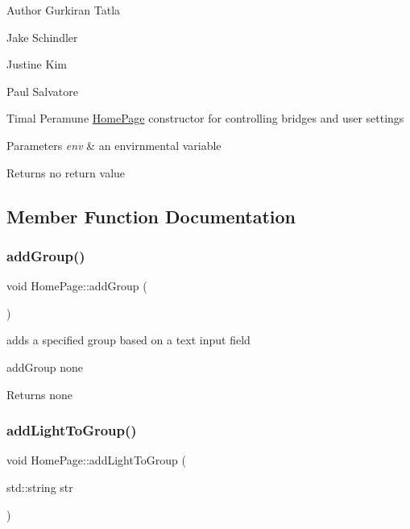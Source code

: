 \begin{DoxyAuthor}{Author}
Gurkiran Tatla 

Jake Schindler 

Justine Kim 

Paul Salvatore 

Timal Peramune \hyperlink{class_home_page}{Home\+Page} constructor for controlling bridges and user settings
\end{DoxyAuthor}

\begin{DoxyParams}{Parameters}
{\em env} & an envirnmental variable \\
\hline
\end{DoxyParams}
\begin{DoxyReturn}{Returns}
no return value 
\end{DoxyReturn}


\subsection{Member Function Documentation}
\mbox{\label{class_home_page_ad81aea92b5f0273686d3b25d22ed6d77}} 
\subsubsection{\texorpdfstring{add\+Group()}{addGroup()}}
{\footnotesize\ttfamily void Home\+Page\+::add\+Group (\begin{DoxyParamCaption}{ }\end{DoxyParamCaption})}



adds a specified group based on a text input field 

add\+Group  none \begin{DoxyReturn}{Returns}
none 
\end{DoxyReturn}
\mbox{\label{class_home_page_ab85e660ef34d71e7d17872937ee01d7f}} 
\subsubsection{\texorpdfstring{add\+Light\+To\+Group()}{addLightToGroup()}}
{\footnotesize\ttfamily void Home\+Page\+::add\+Light\+To\+Group (\begin{DoxyParamCaption}\item[{std\+::string}]{str }\end{DoxyParamCaption})}



